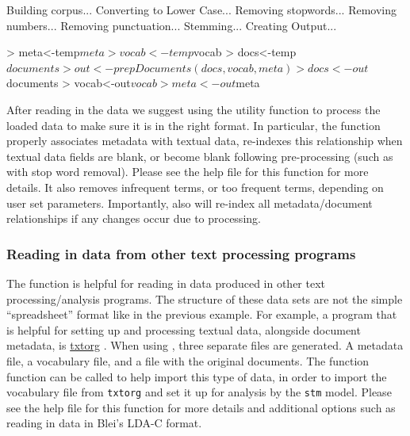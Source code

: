 \documentclass[nojss]{jss}
\begin{document}
\begin{Schunk}
\begin{Soutput}
Building corpus... 
Converting to Lower Case... 
Removing stopwords... 
Removing numbers... 
Removing punctuation... 
Stemming... 
Creating Output... 
\end{Soutput}
\begin{Sinput}
> meta<-temp$meta
> vocab<-temp$vocab
> docs<-temp$documents
> out <- prepDocuments(docs, vocab, meta)
> docs<-out$documents
> vocab<-out$vocab
> meta <-out$meta
\end{Sinput}
\end{Schunk}

After reading in the data we suggest using the utility function  to process the loaded data to make sure it is in the right format. In particular, the  function properly associates metadata with textual data, re-indexes this relationship when textual data fields are blank, or become blank following pre-processing (such as with stop word removal). Please see the help file for this function for more details. It also removes infrequent terms, or too frequent terms, depending on user set parameters. Importantly, also will re-index all metadata/document relationships if any changes occur due to processing.

\subsubsection{Reading in data from other text processing programs}

The  function is helpful for reading in data produced in other text processing/analysis programs. The structure of these data sets are not the simple ``spreadsheet'' format like in the previous example.
For example, a program that is helpful for setting up and processing textual data, alongside document metadata, is \href{www.txtorg.org}{txtorg} \citep{TextComparative}. When using , three separate files are generated. A metadata file, a vocabulary file, and a file with the original documents. The function  function can be called to help import this type of data, in order to import the vocabulary file from \texttt{txtorg} and set it up for analysis by the \texttt{stm} model. Please see the help file for this function for more details and additional options such as reading in data in Blei's LDA-C format.
\end{document}
